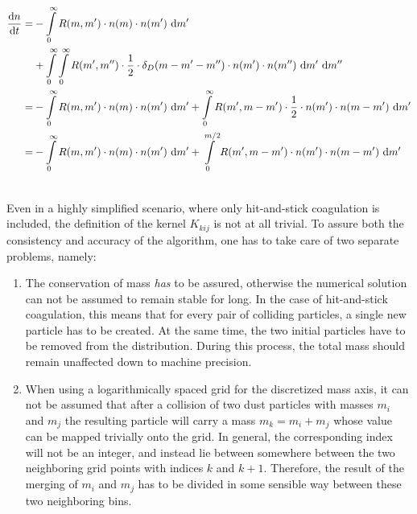     \clearpage

    \begin{align}
        \deriv{n}{t} 
        =
        &-\int\limits_0^\infty R(m,m') \cdot n(m) \cdot n(m') \ \text dm' \\
        &+\int\limits_0^\infty \int\limits_0^\infty R(m',m'') \cdot 
            \frac{1}{2} \cdot \delta_D(m-m'-m'')
            \cdot n(m') \cdot n(m'') \ \text dm' \ \text dm'' \\
        =
        &-\int\limits_0^\infty R(m,m') \cdot n(m) \cdot n(m') \ \text dm'
        +\int\limits_0^\infty R(m',m-m') \cdot \frac{1}{2} \cdot n(m') \cdot n(m-m') \ \text dm' \\
        =
        &-\int\limits_0^\infty R(m,m') \cdot n(m) \cdot n(m') \ \text dm'
        +\int\limits_0^{m/2} R(m',m-m') \cdot n(m') \cdot n(m-m') \ \text dm'
    \end{align}


     \\

    Even in a highly simplified scenario, where only hit-and-stick coagulation is included, the 
    definition of the kernel $K_{kij}$ is not at all trivial. To assure both the consistency and 
    accuracy of the algorithm, one has to take care of two separate problems, namely:
    \begin{enumerate}
        \item The conservation of mass \textit{has} to be assured, otherwise the numerical solution can 
            not be assumed to remain stable for long. In the case of hit-and-stick coagulation, this 
            means that for every pair of colliding particles, a single new particle has to be created. 
            At the same time, the two initial particles have to be removed from the distribution. 
            During this process, the total mass should remain unaffected down to machine precision.
        \item When using a logarithmically spaced grid for the discretized mass axis, it can not be 
            assumed that after a collision of two dust particles with masses $m_i$ and $m_j$ the 
            resulting particle will carry a mass $m_k=m_i+m_j$ whose value can be mapped trivially onto 
            the grid. In general, the corresponding index will not be an integer, and instead lie 
            between somewhere between the two neighboring grid points with indices $k$ and $k+1$.
            Therefore, the result of the merging of $m_i$ and $m_j$ has to be divided in some sensible 
            way between these two neighboring bins.
    \end{enumerate}

